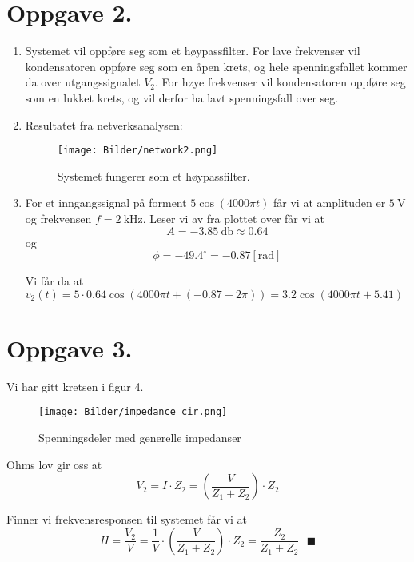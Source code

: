 \documentclass[a4paper,11pt,norsk]{article}
\begin{document}
\section*{Oppgave 2.}
\begin{enumerate}
\item {
    Systemet vil oppføre seg som et høypassfilter. For lave frekvenser vil kondensatoren oppføre seg som en åpen krets,
    og hele spenningsfallet kommer da over utgangssignalet $V_2$. For høye frekvenser vil kondensatoren oppføre seg som 
    en lukket krets, og vil derfor ha lavt spenningsfall over seg.
    \newpage
}
\item {
    Resultatet fra netverksanalysen:
    \begin{figure}[H]
        \centering
        \texttt{[image: Bilder/network2.png]}
        \caption{Systemet fungerer som et høypassfilter.}
    \end{figure}
}
\item {
    For et inngangssignal på forment $5\cos{\left(4000 \pi t\right)}$ får vi at amplituden er $\SI{5}{\volt}$ og 
    frekvensen $f = \SI{2}{\kilo\hertz}$. Leser vi av fra plottet over får vi at
    \[
        A = \SI{-3.85}{\decibel} \approx 0.64
    \]
    og
    \[
        \phi = -49.4^{\circ} = -0.87[\text{rad}]
    \]

    Vi får da at $v_2(t) = 5 \cdot 0.64 \cos{\left(4000 \pi t + (-0.87 + 2\pi)\right)} = 3.2 \cos{\left(4000 \pi t + 5.41\right)}$
}
\end{enumerate}

\newpage
\section*{Oppgave 3.}
Vi har gitt kretsen i figur 4.
\begin{figure}[H]
    \centering
    \texttt{[image: Bilder/impedance\_cir.png]}
    \caption{Spenningsdeler med generelle impedanser}
\end{figure}

Ohms lov gir oss at 
\[
    V_2 = I \cdot Z_2 = \left(\frac{V}{Z_1 + Z_2}\right) \cdot  Z_2
\]

Finner vi frekvensresponsen til systemet får vi at 
\[
    H = \frac{V_2}{V} = \frac{1}{V} \cdot \left(\frac{V}{Z_1 + Z_2}\right) \cdot  Z_2 = \frac{Z_2}{Z_1 + Z_2} \:\:\: \blacksquare
\]
\end{document}
